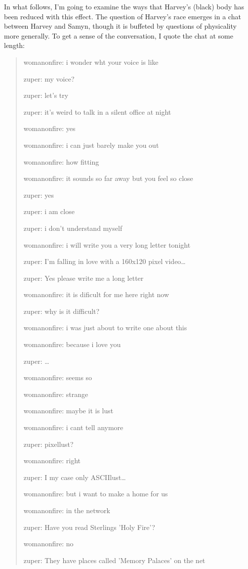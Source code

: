 \documentclass[11pt]{article}
\begin{document}
\begin{enumerate}
In what follows, I'm going to examine the ways that Harvey's (black)
body has been reduced with this effect. The question of Harvey's race
emerges in a chat between Harvey and Samyn, though it is buffeted by
questions of physicality more generally. To get a sense of the
conversation, I quote the chat at some length: 
\begin{quote}
womanonfire: i wonder wht your voice is like

zuper: my voice?

zuper: let's try

zuper: it's weird to talk in a silent office at night

womanonfire: yes

womanonfire: i can just barely make you out

womanonfire: how fitting

womanonfire: it sounds so far away but you feel so close

zuper: yes

zuper: i am close

zuper: i don't understand myself

womanonfire: i will write you a very long letter tonight

zuper: I'm falling in love with a 160x120 pixel video\ldots{}

zuper: Yes please write me a long letter

womanonfire: it is dificult for me here right now

zuper: why is it difficult?

womanonfire: i was just about to write one about this

womanonfire: because i love you

zuper: \ldots{}

womanonfire: seems so 

womanonfire: strange

womanonfire: maybe it is lust

womanonfire: i cant tell anymore

zuper: pixellust?

womanonfire: right

zuper: I my case only ASCIIlust\ldots{}

womanonfire: but i want to make a home for us

womanonfire: in the network

zuper: Have you read Sterlings 'Holy Fire'?

womanonfire: no

zuper: They have places called 'Memory Palaces' on the net


\end{quote}
\end{enumerate}
\end{document}

